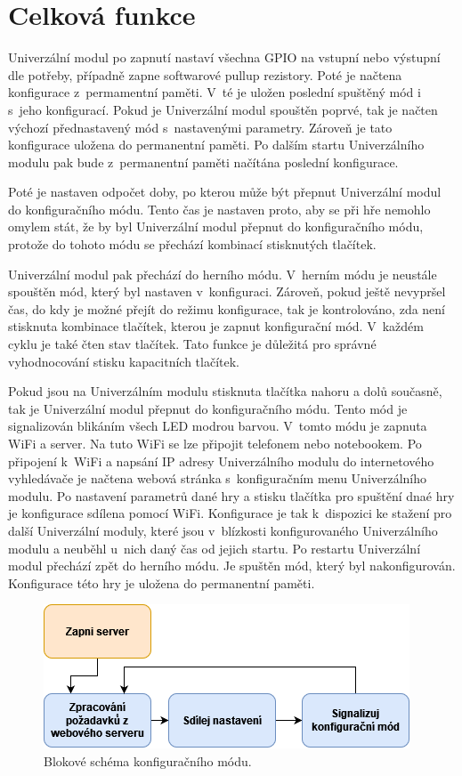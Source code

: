 \section{Celková funkce}
Univerzální modul po zapnutí nastaví všechna GPIO na vstupní nebo výstupní dle potřeby, případně zapne softwarové pullup rezistory. Poté je načtena konfigurace z~permamentní paměti. V~té je uložen poslední spuštěný 
mód  
i s~jeho konfigurací. Pokud je Univerzální modul spouštěn poprvé, tak je načten výchozí přednastavený mód s~nastavenými parametry. Zároveň je tato konfigurace uložena do permanentní paměti. Po dalším startu 
Univerzálního modulu pak bude z~permanentní paměti načítána poslední konfigurace. 

Poté je nastaven odpočet doby, po kterou může být přepnut Univerzální modul do konfiguračního módu. Tento čas je nastaven proto, aby se při hře nemohlo omylem stát, že by byl Univerzální modul přepnut do 
konfiguračního módu, protože do tohoto módu se přechází kombinací stisknutých tlačítek. 

Univerzální modul pak přechází do herního módu. V~herním módu je neustále spouštěn mód, který byl nastaven v~konfiguraci. Zároveň, pokud ještě nevypršel čas, do kdy je možné přejít do režimu konfigurace, tak 
je kontrolováno, zda není stisknuta kombinace tlačítek, kterou je zapnut konfigurační mód. V~každém cyklu je také čten stav tlačítek. Tato funkce je důležitá pro správné vyhodnocování stisku kapacitních tlačítek. 

Pokud jsou na Univerzálním modulu stisknuta tlačítka nahoru a dolů současně, tak je Univerzální modul přepnut do konfiguračního módu. Tento mód je signalizován blikáním všech LED modrou barvou. V~tomto módu je zapnuta WiFi a server. Na 
tuto WiFi se lze připojit telefonem nebo notebookem. Po připojení k~WiFi a napsání IP adresy Univerzálního modulu do internetového vyhledávače je načtena webová stránka s~konfiguračním menu Univerzálního modulu. Po nastavení parametrů 
dané hry a stisku 
tlačítka pro spuštění dnaé hry je konfigurace sdílena pomocí WiFi. Konfigurace je tak k~dispozici ke stažení pro další Univerzální moduly, které jsou v~blízkosti konfigurovaného Univerzálního modulu a neuběhl u~nich daný čas od jejich 
startu. Po restartu Univerzální modul přechází zpět do herního módu. Je spuštěn mód, který byl nakonfigurován. Konfigurace této hry je uložena do permanentní paměti.

\begin{figure}[!h]
  \begin{center}
    \includegraphics[scale=0.8]{obrazky/blokove_schema_modu_CONFIGURATION.png}
  \end{center}
  \caption[Blokové schéma konfiguračního módu]{Blokové schéma konfiguračního módu.}
\end{figure}

